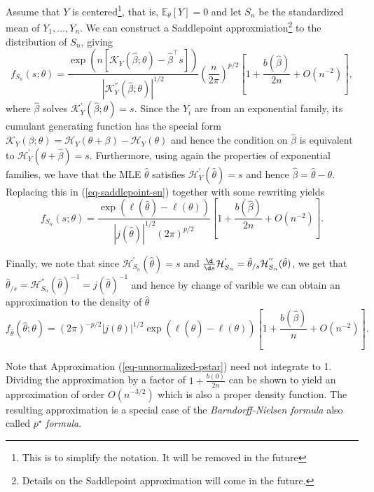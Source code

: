 Assume that $Y$ is centered\footnote{This is to simplify the notation. It will be removed in the future}, that is, $\mathbb{E}_\theta[Y] = 0$ and let $S_n$ be the standardized mean of $Y_1, \ldots, Y_n$. We can construct a Saddlepoint approxmiation\footnote{Details on the Saddlepoint approximation will come in the future.} to the distribution of $S_n$, giving
\begin{equation} \label{eq-saddlepoint-sn}
    f_{S_n}(s; \theta) = \frac{\exp\left(n\left[\mathcal{K}_Y(\hat\beta; \theta) - \hat\beta^\top s\right]\right)}{\left| \mathcal{K}^{''}_Y(\hat\beta; \theta) \right|^{1/2}}\left(\frac{n}{2\pi}\right)^{p/2}\left[ 1 + \frac{b(\hat\beta)}{2n} + O(n^{-2}) \right],
\end{equation}
where $\hat\beta$ solves $\mathcal{K}^{'}_{Y}(\hat\beta; \theta) = s$. Since the $Y_i$ are from an exponential family, its cumulant generating function has the special form $\mathcal{K}_Y(\beta; \theta) = \mathcal{H}_Y(\theta + \beta) - \mathcal{H}_Y(\theta)$ and hence the condition on $\hat\beta$ is equivalent to $\mathcal{H}^{'}_{Y}(\theta + \hat\beta) = s$. Furthermore, using again the properties of exponential families, we have that the MLE $\hat\theta$ satisfies $\mathcal{H}^{'}_{Y}(\hat\theta) = s$ and hence $\hat\beta = \hat\theta - \theta$. Replacing this in (\ref{eq-saddlepoint-sn}) together with some rewriting yields
\begin{equation} \label{eq-saddlepoint-nobeta}
    f_{S_n}(s; \theta) = \frac{\exp\left( \ell(\hat\theta) - \ell(\theta) \right)}{\left| j(\hat\theta) \right|^{1/2}\left(2\pi\right)^{p/2}}\left[ 1 + \frac{b(\hat\beta)}{2n} + O(n^{-2}) \right].
\end{equation}

Finally, we note that since $\mathcal{H}^{'}_{S_n}(\hat\theta) = s$ and $\frac{\d}{\d s}\mathcal{H}^{'}_{S_n} = \hat\theta_{/s}\mathcal{H}^{''}_{S_n}(\hat\theta)$, we get that $\hat\theta_{/s} = \mathcal{H}^{''}_{S_n}(\hat\theta)^{-1} = j(\hat\theta)^{-1}$ and hence by change of varible we can obtain an approximation to the density of $\hat\theta$ 
\begin{equation*} \label{eq-unnormalized-pstar}
    f_{\hat\theta}(\hat\theta; \theta) = \left(2\pi\right)^{-p/2}\left| j(\theta) \right|^{1/2}  \exp\left( \ell(\hat\theta) - \ell(\theta) \right) \left[ 1 + \frac{b(\hat\beta)}{n} + O(n^{-2}) \right].
\end{equation*}

Note that Approximation (\ref{eq-unnormalized-pstar}) need not integrate to 1. Dividing the approximation by a factor of $1 + \frac{b(0)}{2n}$ can be shown to yield an approximation of order $O(n^{-3/2})$ which is also a proper density function. The resulting approximation is a special case of the \textit{Barndorff-Nielsen formula} also called $p^\star$ \textit{formula}.

